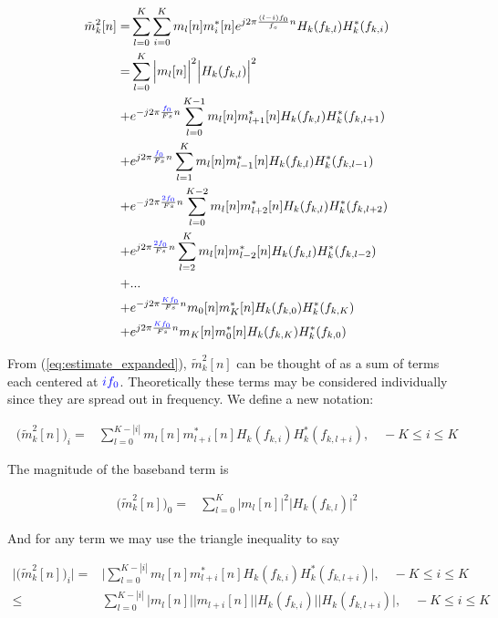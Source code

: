 \documentclass [11pt, proquest,oneside] {ganter_thesis}[2015/03/03]
\newcommand*{\mathcolor}{}
\def\mathcolor#1#{\mathcoloraux{#1}}
\newcommand*{\mathcoloraux}[3]{%
  \protect\leavevmode
  \begingroup
    \color#1{#2}#3%
  \endgroup
}
\begin{document}
\begin{align}
\tilde{m}_k^2[n] =& \sum\limits_{l=0}^K \sum\limits_{i=0}^K m_l[n] m_i^*[n] e^{j2\pi\frac{(l-i)f_0}{f_s}n} H_k(f_{k,l})H_k^*(f_{k,i}) \\
%
%
%
\label{eq:estimate_expanded}
=& \sum\limits_{l=0}^K \Big|m_l[n]\Big|^2 \Big|H_k(f_{k,l})\Big|^2 \nonumber \\
%
%
+& e^{-j2\pi \frac{\mathcolor{blue}{f_0}}{Fs}n} \sum\limits_{l=0}^{K-1} m_l[n] m_{l+1}^*[n] H_k(f_{k,l})H_k^*(f_{k,l+1}) \nonumber \\
%
+&  e^{j2\pi \frac{\mathcolor{blue}{f_0}}{Fs}n} \sum\limits_{l=1}^{K} m_l[n] m_{l-1}^*[n] H_k(f_{k,l})H_k^*(f_{k,l-1}) \nonumber \\
%
%
+& e^{-j2\pi \frac{\mathcolor{blue}{2f_0}}{Fs}n} \sum\limits_{l=0}^{K-2} m_l[n] m_{l+2}^*[n] H_k(f_{k,l})H_k^*(f_{k,l+2}) \nonumber \\
%
+& e^{j2\pi \frac{\mathcolor{blue}{2f_0}}{Fs}n}  \sum\limits_{l=2}^{K} m_l[n] m_{l-2}^*[n] H_k(f_{k,l})H_k^*(f_{k,l-2}) \nonumber \\
%
%
+& ... \nonumber \\
%
%
+& e^{-j2\pi \frac{\mathcolor{blue}{Kf_0}}{Fs}n} m_0[n] m_K^*[n] H_k(f_{k,0})H_k^*(f_{k,K}) \nonumber \\
%
+& e^{j2\pi \frac{\mathcolor{blue}{Kf_0}}{Fs}n}  m_K[n] m_0^*[n] H_k(f_{k,K})H_k^*(f_{k,0})
\end{align}

From (\ref{eq:estimate_expanded}), $\tilde{m}^2_k[n]$ can be thought of as a sum of terms each centered at $\mathcolor{blue}{if_0}$.  Theoretically these terms may be considered individually since they are spread out in frequency.  We define a new notation:

\begin{align}
\label{eq:subband}
\Big( \tilde{m}^2_k[n]\Big)_i =& \sum\limits_{l=0}^{K-|i|} m_l[n] m^*_{l+i}[n] H_k(f_{k,i}) H^*_k(f_{k,l+i}), \quad -K \leq i \leq K
\end{align}

The magnitude of the baseband term is

\begin{align}
\label{eq:subband_DC}
\Big( \tilde{m}^2_k[n]\Big)_0 =& \sum\limits_{l=0}^K \Big|m_l[n]\Big|^2 \Big|H_k(f_{k,l})\Big|^2
\end{align}

And for any term we may use the triangle inequality to say

\begin{align}
\Bigg| \Big( \tilde{m}^2_k[n]\Big)_i \Bigg| =& \Bigg| \sum\limits_{l=0}^{K-|i|} m_l[n] m^*_{l+i}[n] H_k(f_{k,i}) H^*_k(f_{k,l+i})\Bigg|, \quad -K \leq i \leq K \nonumber \\
%
\label{eq:subband_triangle}
\leq& \sum\limits_{l=0}^{K-|i|} \Big| m_l[n]\Big| \Big|m_{l+i}[n]\Big| \Big|H_k(f_{k,i})\Big| \Big|H_k(f_{k,l+i})\Big|, \quad -K \leq i \leq K
\end{align}
\end{document}
